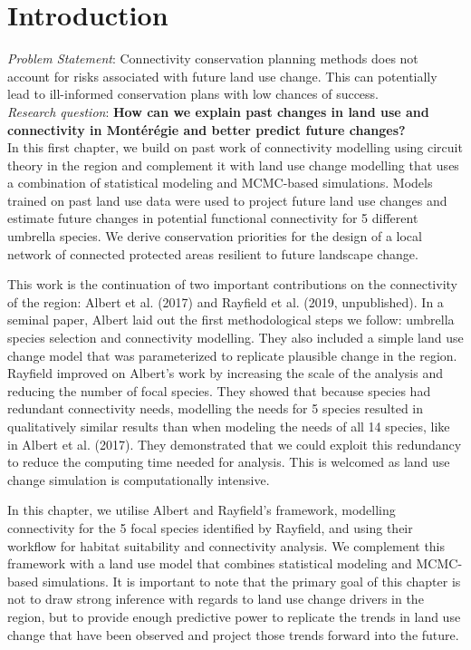 \section{Introduction}
\textit{Problem Statement}: Connectivity conservation planning methods does not account for risks associated with future land use change. This can potentially lead to ill-informed conservation plans with low chances of success.\\

\textit{Research question}: \textbf{How can we explain past changes in land use and connectivity in Montérégie and better predict future changes?}\\

In this first chapter, we build on past work of connectivity modelling using circuit theory in the region and complement it with land use change modelling that uses a combination of statistical modeling and MCMC-based simulations. Models trained on past land use data were used to project future land use changes and estimate future changes in potential functional connectivity for 5 different umbrella species. We derive conservation priorities for the design of a local network of connected protected areas resilient to future landscape change.

This work is the continuation of two important contributions on the connectivity of the region: Albert et al. (2017) and Rayfield et al. (2019, unpublished). In a seminal paper, Albert laid out the first methodological steps we follow: umbrella species selection and connectivity modelling. They also included a simple land use change model that was parameterized to replicate plausible change in the region. Rayfield improved on Albert’s work by increasing the scale of the analysis and reducing the number of focal species. They showed that because species had redundant connectivity needs, modelling the needs for 5 species resulted in qualitatively similar results than when modeling the needs of all 14 species, like in Albert et al. (2017). They demonstrated that we could exploit this redundancy to reduce the computing time needed for analysis. This is welcomed as land use change simulation is computationally intensive.

In this chapter, we utilise Albert and Rayfield’s framework, modelling connectivity for the 5 focal species identified by Rayfield, and using their workflow for habitat suitability and connectivity analysis. We complement this framework with a land use model that combines statistical modeling and MCMC-based simulations. It is important to note that the primary goal of this chapter is not to draw strong inference with regards to land use change drivers in the region, but to provide enough predictive power to replicate the trends in land use change that have been observed and project those trends forward into the future.

